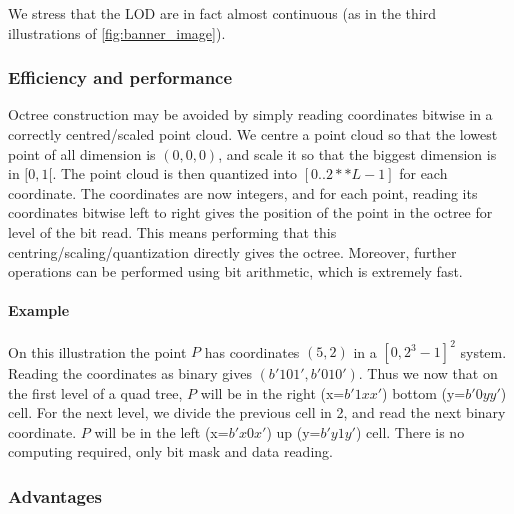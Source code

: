 	 	We stress that the LOD are in fact almost continuous (as in the third illustrations of \ref{fig:banner_image}).
	 		\subsubsection{Efficiency and performance}
	 		\label{subsubsec:bit_coordinates}
	 		Octree construction may be avoided by simply reading coordinates bitwise in a correctly centred/scaled point cloud.
	 		We centre a point cloud so that the lowest point of all dimension is $(0,0,0)$, and scale it so that the biggest dimension is in $[0,1[$.
	 		The point cloud is then quantized into $[0..2**L-1]$ for each coordinate.
	 		The coordinates are now integers, and for each point, reading its coordinates bitwise left to right gives the position of the point in the octree for level of the bit read.
	 		This means performing that this centring/scaling/quantization directly gives the octree. Moreover, further operations can be performed using bit arithmetic, which is extremely fast.
	 		
	 		\paragraph{Example} 
	 		
	 		On this illustration the point $P$ has coordinates $(5,2)$ in a $[0,2^3-1]^2$ system. Reading the coordinates as binary gives $(b'101',b'010')$.
	 		Thus we now that on the first level of a quad tree, $P$ will be in the right (x=$b'1xx'$) bottom (y=$b'0yy'$) cell.
	 		For the next level, we divide the previous cell in 2, and read the next binary coordinate. $P$ will be in the left (x=$b'x0x'$) up (y=$b'y1y'$) cell. There is no computing required, only bit mask and data reading.
	 		\subsubsection{Advantages}	
	 		
